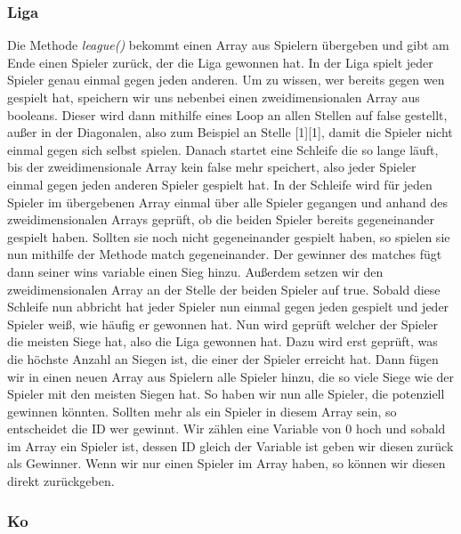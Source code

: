 \documentclass[a4paper, 12pt]{scrartcl}
\begin{document}
\subsubsection{Liga}

Die Methode \emph{league()} bekommt einen Array aus Spielern übergeben und gibt am Ende einen Spieler zurück, der die Liga gewonnen hat. In der Liga spielt jeder Spieler genau einmal gegen jeden anderen. Um zu wissen, wer bereits gegen wen gespielt hat, speichern wir uns nebenbei einen zweidimensionalen Array aus booleans. Dieser wird dann mithilfe eines Loop an allen Stellen auf false gestellt, außer in der Diagonalen, also zum Beispiel an Stelle [1][1], damit die Spieler nicht einmal gegen sich selbst spielen. Danach startet eine Schleife die so lange läuft, bis der zweidimensionale Array kein false mehr speichert, also jeder Spieler einmal gegen jeden anderen Spieler gespielt hat. In der Schleife wird für jeden Spieler im übergebenen Array einmal über alle Spieler gegangen und anhand des zweidimensionalen Arrays geprüft, ob die beiden Spieler bereits gegeneinander gespielt haben. Sollten sie noch nicht gegeneinander gespielt haben, so spielen sie nun mithilfe der Methode match gegeneinander. Der gewinner des matches fügt dann seiner wins variable einen Sieg hinzu. Außerdem setzen wir den zweidimensionalen Array an der Stelle der beiden Spieler auf true. Sobald diese Schleife nun abbricht hat jeder Spieler nun einmal gegen jeden gespielt und jeder Spieler weiß, wie häufig er gewonnen hat. Nun wird geprüft welcher der Spieler die meisten Siege hat, also die Liga gewonnen hat. Dazu wird erst geprüft, was die höchste Anzahl an Siegen ist, die einer der Spieler erreicht hat. Dann fügen wir in einen neuen Array aus Spielern alle Spieler hinzu, die so viele Siege wie der Spieler mit den meisten Siegen hat. So haben wir nun alle Spieler, die potenziell gewinnen könnten. Sollten mehr als ein Spieler in diesem Array sein, so entscheidet die ID wer gewinnt. Wir zählen eine Variable von 0 hoch und sobald im Array ein Spieler ist, dessen ID gleich der Variable ist geben wir diesen zurück als Gewinner. Wenn wir nur einen Spieler im Array haben, so können wir diesen direkt zurückgeben.

\subsubsection{Ko}
\end{document}
